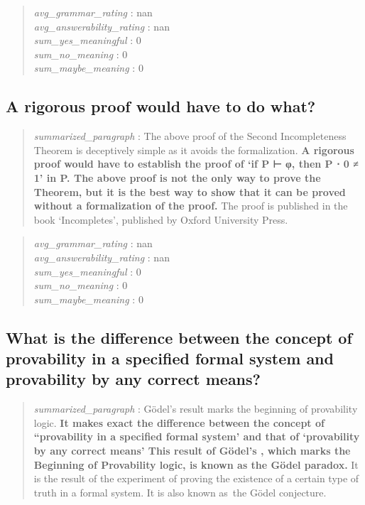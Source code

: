 \begin{quote}
\emph{avg\_grammar\_rating} : nan\\
\emph{avg\_answerability\_rating} : nan\\
\emph{sum\_yes\_meaningful} : 0\\
\emph{sum\_no\_meaning} : 0\\
\emph{sum\_maybe\_meaning} : 0
\end{quote}

\hypertarget{a-rigorous-proof-would-have-to-do-what}{%
\subsection{A rigorous proof would have to do
what?}\label{a-rigorous-proof-would-have-to-do-what}}

\begin{quote}
\emph{summarized\_paragraph} : The above proof of the Second
Incompleteness Theorem is deceptively simple as it avoids the
formalization. \textbf{A rigorous proof would have to establish the
proof of `if P ⊢ φ, then P ⋅ 0 ≠ 1' in P. The above proof is not the
only way to prove the Theorem, but it is the best way to show that it
can be proved without a formalization of the proof.} The proof is
published in the book `Incompletes', published by Oxford University
Press.
\end{quote}

\begin{quote}
\emph{avg\_grammar\_rating} : nan\\
\emph{avg\_answerability\_rating} : nan\\
\emph{sum\_yes\_meaningful} : 0\\
\emph{sum\_no\_meaning} : 0\\
\emph{sum\_maybe\_meaning} : 0
\end{quote}

\hypertarget{what-is-the-difference-between-the-concept-of-provability-in-a-specified-formal-system-and-provability-by-any-correct-means}{%
\subsection{What is the difference between the concept of provability in
a specified formal system and provability by any correct
means?}\label{what-is-the-difference-between-the-concept-of-provability-in-a-specified-formal-system-and-provability-by-any-correct-means}}

\begin{quote}
\emph{summarized\_paragraph} : Gödel's result marks the beginning of
provability logic. \textbf{It makes exact the difference between the
concept of ``provability in a specified formal system' and that of
`provability by any correct means' This result of Gödel's , which marks
the Beginning of Provability logic, is known as the Gödel paradox.} It
is the result of the experiment of proving the existence of a certain
type of truth in a formal system. It is also known as~the Gödel
conjecture.
\end{quote}

